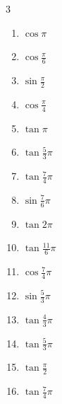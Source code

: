 \begin{multicols}{3}
\begin{enumerate}
  \item $\displaystyle \cos{\pi}$
        \phantom{$\displaystyle =-1$}

  \item $\displaystyle \cos{\frac{\pi}{6}}$

  \item $\displaystyle \sin{\frac{\pi}{2}}$
        \phantom{$\displaystyle =1$}

  \item $\displaystyle \cos{\frac{\pi}{4}}$

  \item $\displaystyle \tan{\pi}$
        \phantom{$\displaystyle =0$}

  \item $\displaystyle \tan{\frac{5}{3}\pi}$

  \item $\displaystyle \tan{\frac{7}{4}\pi}$
        \phantom{$\displaystyle =-1$}

  \item $\displaystyle \sin{\frac{7}{6}\pi}$

  \item $\displaystyle \tan{2\pi}$
        \phantom{$\displaystyle =0$}

  \item $\displaystyle \tan{\frac{11}{6}\pi}$

  \item $\displaystyle \cos{\frac{7}{4}\pi}$

  \item $\displaystyle \sin{\frac{5}{3}\pi}$

  \item $\displaystyle \tan{\frac{4}{3}\pi}$

  \item $\displaystyle \tan{\frac{5}{3}\pi}$

  \item $\displaystyle \tan{\frac{\pi}{2}}$
        \phantom{$\displaystyle \quad なし$}

  \item $\displaystyle \tan{\frac{7}{4}\pi}$
        \phantom{$\displaystyle =-1$}


\end{enumerate}
\end{multicols}
